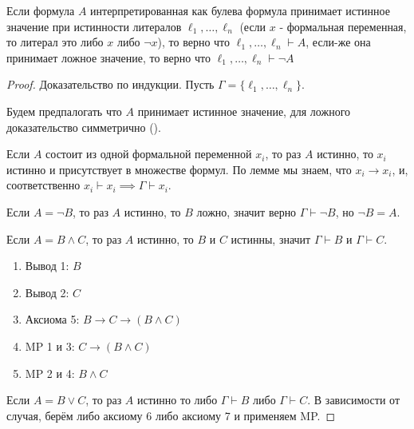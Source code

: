 \begin{lemma} \label{logic_truth_table} \thmslashn

    Если формула $A$ интерпретированная как булева формула принимает истинное значение при истинности литералов $\ell_1, \ldots, \ell_{n}$ (если $x$ - формальная переменная, то литерал это либо $x$ либо $\neg x$), то верно что $\ell_1, \ldots, \ell_{n} \vdash A$, если-же она принимает ложное значение, то верно что $\ell_1, \ldots, \ell_{n} \vdash \neg A$
    \begin{proof} \thmslashn
    
       Доказательство по индукции. Пусть $\Gamma = \{\ell_1, \ldots, \ell_{n}\} $.

       Будем предпалогать что $A$ принимает истинное значение, для ложного доказательство симметрично ().

       Если $A$ состоит из одной формальной переменной $x_{i}$, то раз $A$ истинно, то $x_{i}$ истинно и присутствует в множестве формул. По лемме мы знаем, что $x_{i} \to x_{i}$, и, соответственно $x_{i} \vdash x_{i} \implies \Gamma \vdash x_{i}$.

       Если $A = \neg B$, то раз $A$ истинно, то $B$ ложно, значит верно $\Gamma \vdash \neg B$, но $\neg B = A$.

       Если $A = B \land C$, то раз $A$ истинно, то $B$ и $C$ истинны, значит $\Gamma \vdash B$ и  $\Gamma \vdash C$. 
       \begin{enumerate}
           \item Вывод 1: $B$
           \item Вывод 2: $C$
           \item Аксиома 5: $B \to C \to (B \land C)$
           \item MP 1 и 3: $C \to (B \land C)$
           \item MP 2 и 4: $B \land C$
       \end{enumerate}

        Если $A = B \lor C$, то раз $A$ истинно то либо $\Gamma \vdash B$ либо $\Gamma \vdash C$. В зависимости от случая, берём либо аксиому 6 либо аксиому 7 и применяем MP.
    \end{proof}
\end{lemma}
